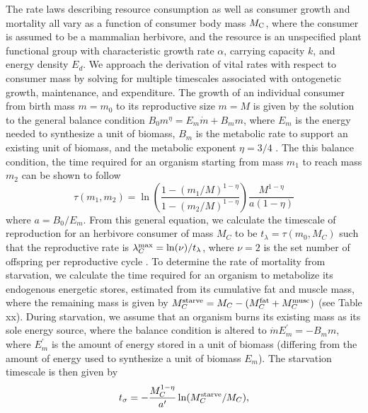 \documentclass[11pt]{article}
\begin{document}
The rate laws describing resource consumption as well as consumer growth and mortality all vary as a function of consumer body mass $M_{\rm C}$, where the consumer is assumed to be a mammalian herbivore, and the resource is an unspecified plant functional group with characteristic growth rate $\alpha$, carrying capacity $k$, and energy density $E_d$. %
We approach the derivation of vital rates with respect to consumer mass by solving for multiple timescales associated with ontogenetic growth, maintenance, and expenditure.
The growth of an individual consumer from birth mass $m=m_0$ to its reproductive size $m=M$ is given by the solution to the general balance condition $B_0 m^\eta = E_m \dot{m} + B_m m$, where $E_m$ is the energy needed to synthesize a unit of biomass, $B_m$ is the metabolic rate to support an existing unit of biomass, and the metabolic exponent $\eta=3/4$ \citep{West:2001bv}.
The this balance condition, the time required for an organism starting from mass $m_1$ to reach mass $m_2$ can be shown to follow
\begin{equation}
    \tau(m_1,m_2) = \ln\left(\frac{1 - (m_1/M)^{1-\eta}}{1-(m_2/M)^{1-\eta}}\right)\frac{M^{1-\eta}}{a(1-\eta)}
\end{equation}
where $a = B_0/E_m$.
From this general equation, we calculate the timescale of reproduction for an herbivore consumer of mass $M_C$ to be $t_\lambda = \tau(m_0,M_C)$ such that the reproductive rate is $\lambda^{\rm max}_C = \ln(\nu)/t_\lambda$, where $\nu=2$ is the set number of offspring per reproductive cycle \citep{Savage2004,yeakel2018dynamics}.
To determine the rate of mortality from starvation, we calculate the time required for an organism to metabolize its endogenous energetic stores, estimated from its cumulative fat and muscle mass, where the remaining mass is given by $M_C^{\rm starve} = M_C - (M_C^{\rm fat} + M_C^{\rm musc})$ (see Table xx).
During starvation, we assume that an organism burns its existing mass as its sole energy source, where the balance condition is altered to $\dot{m}E^\prime_m = -B_m m$, where $E_m^\prime$ is the amount of energy stored in a unit of biomass (differing from the amount of energy used to synthesize a unit of biomass $E_m$).
The starvation timescale is then given by
\begin{equation}
    t_\sigma = -\frac{M_C^{1-\eta}}{a^\prime}\ln(M_C^{\rm starve}/M_C),
\end{equation}
\end{document}
